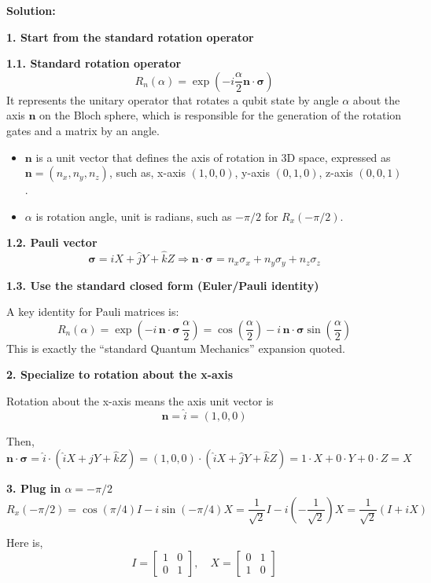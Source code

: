 \documentclass[11pt]{article}
\newenvironment{solution}
{\par\noindent\textbf{Solution:}\par}
{\vspace{1em}}
\begin{document}
\begin{solution}

\textbf{1. Start from the standard rotation operator}

\textbf{1.1. Standard rotation operator}
\[
R_n(\alpha) = \exp\left(-i \frac{\alpha}{2} \mathbf{n} \cdot \boldsymbol{\sigma} \right)
\]
It represents the unitary operator that rotates a qubit state by angle $\alpha$ about the axis $\mathbf{n}$ on the Bloch sphere, which is responsible for the generation of the rotation gates and a matrix by an angle.
\begin{itemize}
\item $\mathbf{n}$ is a unit vector that defines the axis of rotation in 3D space, expressed as $\mathbf{n} = (n_x, n_y, n_z)$, such as, x-axis $(1,0,0)$, y-axis $(0,1,0)$, z-axis $(0,0,1)$.
\item $\alpha$ is rotation angle, unit is radians, such as $-\pi/2$ for $R_x(-\pi/2)$.
\end{itemize}

\textbf{1.2. Pauli vector}
\[
\boldsymbol{\sigma} = \hat{i}X + \hat{j}Y + \hat{k}Z \Rightarrow \mathbf{n} \cdot \boldsymbol{\sigma} = n_x \sigma_x + n_y \sigma_y + n_z \sigma_z
\]

\textbf{1.3. Use the standard closed form (Euler/Pauli identity)}

A key identity for Pauli matrices is: 
\[
R_n(\alpha)=\exp\left(-i\,\mathbf{n}\cdot\boldsymbol{\sigma}\,\frac{\alpha}{2}\right)
=\cos\left(\frac{\alpha}{2}\right)-i\,\mathbf{n}\cdot\boldsymbol{\sigma}\sin\left(\frac{\alpha}{2}\right)
\]
This is exactly the “standard Quantum Mechanics” expansion quoted.

\textbf{2. Specialize to rotation about the x-axis}

Rotation about the x-axis means the axis unit vector is
\[
\mathbf{n} = \hat{i} = (1,0,0)
\]

Then,
\[
\mathbf{n} \cdot \boldsymbol{\sigma} = \hat{i} \cdot (\hat{i}X + \hat{j}Y + \hat{k}Z) = (1,0,0) \cdot (\hat{i}X + \hat{j}Y + \hat{k}Z) = 1 \cdot X + 0 \cdot Y + 0 \cdot Z = X
\]

\textbf{3. Plug in $\alpha = -\pi/2$}
\[
R_x(-\pi/2) = \cos(\pi/4)I - i \sin(-\pi/4)X = \frac{1}{\sqrt{2}}I - i\left(-\frac{1}{\sqrt{2}} \right)X = \frac{1}{\sqrt{2}}(I + iX)
\]

Here is,
\[
I = \begin{bmatrix}1&0\\0&1\end{bmatrix}, \quad X = \begin{bmatrix}0&1\\1&0\end{bmatrix}
\]


\end{solution}
\end{document}
